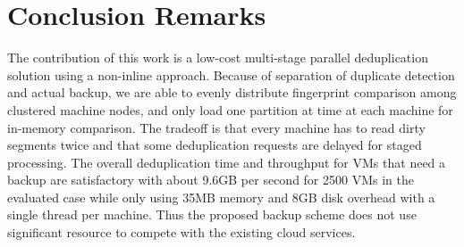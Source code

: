 \section{Conclusion Remarks}
\label{sect:final}

The contribution  of this work is a low-cost multi-stage parallel deduplication solution
using a non-inline approach. Because of separation  of duplicate detection and actual backup,
we are able to evenly distribute  fingerprint comparison among clustered machine
nodes, and only load one partition at time at each machine for in-memory comparison.
The tradeoff is that every machine has to read dirty segments twice 
and that some deduplication requests are delayed for staged processing.  The overall 
deduplication time and throughput for VMs that need a backup are satisfactory 
with about 9.6GB per second for 2500 VMs in the evaluated case while only
using 35MB memory and  8GB disk overhead  with a single thread  per machine. Thus the proposed  backup
scheme does not use significant  resource to compete  with the existing cloud services.




